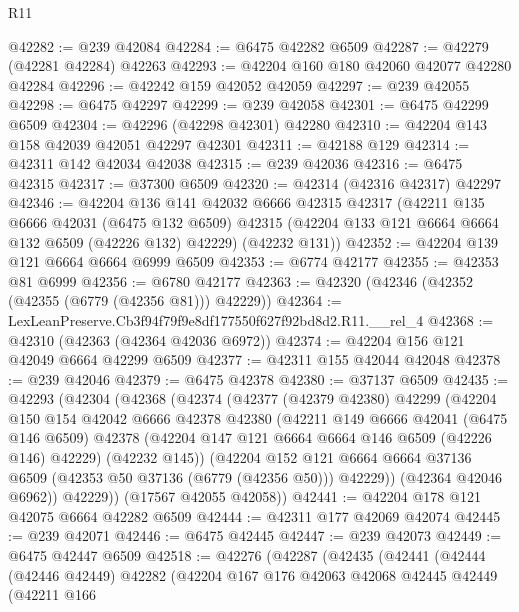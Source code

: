 \begin{lexlean}{R11}
\begin{coremodule}
@42282 := @239 @42084
@42284 := @6475 @42282 @6509
@42287 := @42279 (@42281 @42284) @42263
@42293 := @42204 @160 @180 @42060 @42077 @42280 @42284
@42296 := @42242 @159 @42052 @42059
@42297 := @239 @42055
@42298 := @6475 @42297
@42299 := @239 @42058
@42301 := @6475 @42299 @6509
@42304 := @42296 (@42298 @42301) @42280
@42310 := @42204 @143 @158 @42039 @42051 @42297 @42301
@42311 := @42188 @129
@42314 := @42311 @142 @42034 @42038
@42315 := @239 @42036
@42316 := @6475 @42315
@42317 := @37300 @6509
@42320 := @42314 (@42316 @42317) @42297
@42346 := @42204
    @136
    @141
    @42032
    @6666
    @42315
    @42317
    (@42211
      @135
      @6666
      @42031
      (@6475 @132 @6509)
      @42315
      (@42204 @133 @121 @6664 @6664 @132 @6509 (@42226 @132) @42229)
      (@42232 @131))
@42352 := @42204 @139 @121 @6664 @6664 @6999 @6509
@42353 := @6774 @42177
@42355 := @42353 @81 @6999
@42356 := @6780 @42177
@42363 := @42320 (@42346 (@42352 (@42355 (@6779 (@42356 @81))) @42229))
@42364 := LexLeanPreserve.Cb3f94f79f9e8df177550f627f92bd8d2.R11.__rel_4
@42368 := @42310 (@42363 (@42364 @42036 @6972))
@42374 := @42204 @156 @121 @42049 @6664 @42299 @6509
@42377 := @42311 @155 @42044 @42048
@42378 := @239 @42046
@42379 := @6475 @42378
@42380 := @37137 @6509
@42435 := @42293
    (@42304
      (@42368
        (@42374
          (@42377
            (@42379 @42380)
            @42299
            (@42204
              @150
              @154
              @42042
              @6666
              @42378
              @42380
              (@42211
                @149
                @6666
                @42041
                (@6475 @146 @6509)
                @42378
                (@42204 @147 @121 @6664 @6664 @146 @6509 (@42226 @146) @42229)
                (@42232 @145))
              (@42204
                @152
                @121
                @6664
                @6664
                @37136
                @6509
                (@42353 @50 @37136 (@6779 (@42356 @50)))
                @42229))
            (@42364 @42046 @6962))
          @42229))
      (@17567 @42055 @42058))
@42441 := @42204 @178 @121 @42075 @6664 @42282 @6509
@42444 := @42311 @177 @42069 @42074
@42445 := @239 @42071
@42446 := @6475 @42445
@42447 := @239 @42073
@42449 := @6475 @42447 @6509
@42518 := @42276
    (@42287
      (@42435
        (@42441
          (@42444
            (@42446 @42449)
            @42282
            (@42204
              @167
              @176
              @42063
              @42068
              @42445
              @42449
              (@42211
                @166

\end{coremodule}
\end{lexlean}
